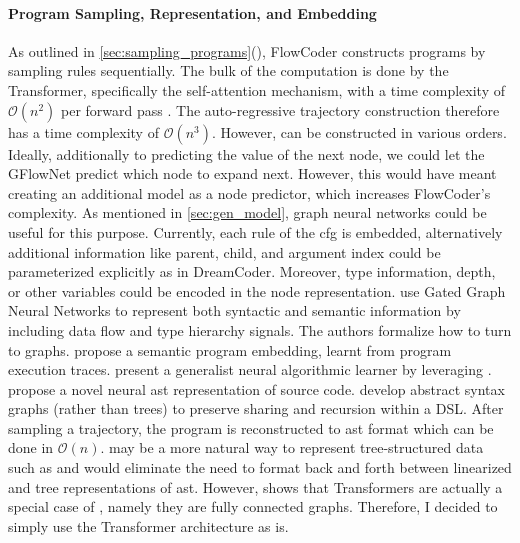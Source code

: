 \paragraph*{Program Sampling, Representation, and Embedding}
As outlined in \autoref{sec:sampling_programs}(), FlowCoder constructs programs by sampling rules sequentially. The bulk of the computation is done by the Transformer, specifically the self-attention mechanism, with a time complexity of $\mathcal{O}(n^2)$ per forward pass \cite{keles2022computational}. The auto-regressive trajectory construction therefore has a time complexity of $\mathcal{O}(n^3)$. However,  can be constructed in various orders. Ideally, additionally to predicting the value of the next node, we could let the GFlowNet predict which node to expand next. However, this would have meant creating an additional model as a node predictor, which increases FlowCoder's complexity. As mentioned in \autoref{sec:gen_model}, graph neural networks could be useful for this purpose. Currently, each rule of the \acrshort{cfg} is embedded, alternatively additional information like parent, child, and argument index could be parameterized explicitly as in DreamCoder. Moreover, type information, depth, or other variables could be encoded in the node representation. 
\citet{allamanis_learning_2018} use Gated Graph Neural Networks to represent both syntactic and semantic information by including data flow and type hierarchy signals. The authors formalize how to turn  to graphs. \citet{wang2017dynamic} propose a semantic program embedding, learnt from program execution traces. \citet{ibarz_generalist_2022} present a generalist neural algorithmic learner by leveraging . \citet{zhangNovelNeuralSource2019} propose a novel neural \acrshort{ast} representation of source code. \citet{oliveiraAbstractSyntaxGraphs2013} develop abstract syntax graphs (rather than trees) to preserve sharing and recursion within a DSL. After sampling a trajectory, the program is reconstructed to \acrshort{ast} format which can be done in $\mathcal{O}(n)$.
 may be a more natural way to represent tree-structured data such as  and would eliminate the need to format back and forth between linearized and tree representations of \acrshort{ast}. However, \citet{joshi2020transformers} shows that Transformers are actually a special case of , namely they are fully connected graphs. Therefore, I decided to simply use the Transformer architecture as is.

